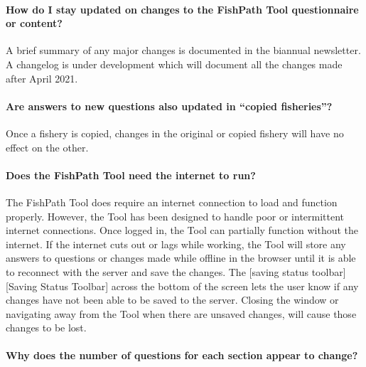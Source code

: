 \documentclass[
  11pt,
]{book}
\begin{document}
\hypertarget{faq-stay-updated}{%
\paragraph{How do I stay updated on changes to the FishPath Tool questionnaire or content?}\label{faq-stay-updated}}

A brief summary of any major changes is documented in the biannual newsletter. A changelog is under development which will document all the changes made after April 2021.

\hypertarget{faq-copy-fisheries}{%
\paragraph{Are answers to new questions also updated in ``copied fisheries''?}\label{faq-copy-fisheries}}

Once a fishery is copied, changes in the original or copied fishery will have no effect on the other.

\hypertarget{faq-internet}{%
\paragraph{Does the FishPath Tool need the internet to run?}\label{faq-internet}}

The FishPath Tool does require an internet connection to load and function properly. However, the Tool has been designed to handle poor or intermittent internet connections. Once logged in, the Tool can partially function without the internet. If the internet cuts out or lags while working, the Tool will store any answers to questions or changes made while offline in the browser until it is able to reconnect with the server and save the changes. The {[}saving status toolbar{]}{[}Saving Status Toolbar{]} across the bottom of the screen lets the user know if any changes have not been able to be saved to the server. Closing the window or navigating away from the Tool when there are unsaved changes, will cause those changes to be lost.

\hypertarget{faq-question-numbering}{%
\paragraph{Why does the number of questions for each section appear to change?}\label{faq-question-numbering}}
\end{document}
